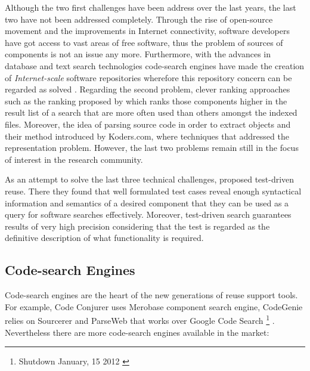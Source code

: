 Although the two first challenges have been address over the last years, the last two have not been addressed completely. Through the rise of open-source movement and the improvements in Internet connectivity, software developers have got access to vast areas of free software, thus the problem of sources of components is not an issue any more. Furthermore, with the advances in database and text search technologies code-search engines have made the creation of \textit{Internet-scale} software repositories wherefore this repository concern can be regarded as solved \cite{Hummel2013}. Regarding the second problem, clever ranking approaches such as the ranking proposed by \citet{Inoue2005} which ranks those components higher in the result list of a search that are more often used than others amongst the indexed files. Moreover, the idea of parsing source code in order to extract objects and their method introduced by Koders.com, where techniques that addressed the representation problem. However, the last two problems remain still in the focus of interest in the research community.

As an attempt to solve the last three technical challenges, \citet{Hummel2013} proposed test-driven reuse. There they found that well formulated test cases reveal enough syntactical information and semantics of a desired component that they can be used as a query for software searches effectively\cite{Hummel2013}. Moreover, test-driven search guarantees results of very high precision considering that the test is regarded as the definitive description of what functionality is required\citep{Beck2003,Hummel2013,Kessel2016}.

\subsection{Code-search Engines}
Code-search engines are the heart of the new generations of reuse support tools. For example, Code Conjurer \cite{Hummel2008} uses Merobase component search engine, CodeGenie relies on Sourcerer \cite{Lemos2007} and ParseWeb that works over Google Code Search \footnote{Shutdown January, 15 2012 \cite{Horowitz2011}} \cite{Thummalapenta2007}. Nevertheless there are more code-search engines available in the market:


